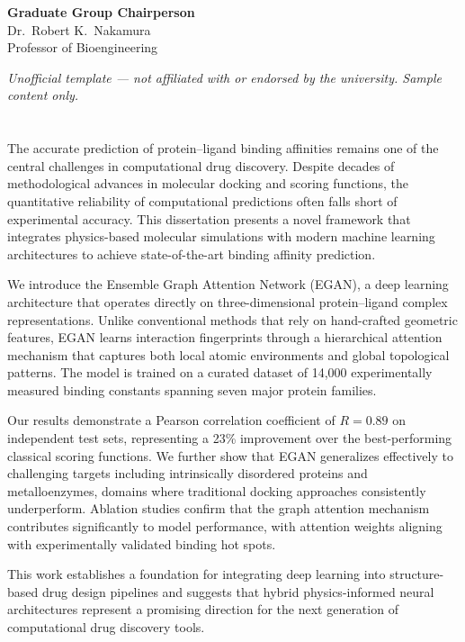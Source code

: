 \documentclass[12pt,oneside]{report}
\renewenvironment{abstract}
  {\chapter*{\abstractname}
   \addcontentsline{toc}{chapter}{\abstractname}
   \singlespacing}
  {}
\begin{document}
\begin{titlepage}
\begin{center}
\vspace{0.8cm}

\begin{minipage}{0.7\textwidth}
\centering
{\large\bfseries Graduate Group Chairperson}\\[8pt]
{\large Dr.\ Robert K.\ Nakamura}\\[4pt]
{\normalsize Professor of Bioengineering}
\end{minipage}

\vfill

{\footnotesize\itshape\color{Charcoal}
Unofficial template --- not affiliated with or endorsed by the university. Sample content only.}

\end{center}
\end{titlepage}


\begin{abstract}

The accurate prediction of protein--ligand binding affinities remains one of the central challenges in computational drug discovery. Despite decades of methodological advances in molecular docking and scoring functions, the quantitative reliability of computational predictions often falls short of experimental accuracy. This dissertation presents a novel framework that integrates physics-based molecular simulations with modern machine learning architectures to achieve state-of-the-art binding affinity prediction.

We introduce the Ensemble Graph Attention Network (EGAN), a deep learning architecture that operates directly on three-dimensional protein--ligand complex representations. Unlike conventional methods that rely on hand-crafted geometric features, EGAN learns interaction fingerprints through a hierarchical attention mechanism that captures both local atomic environments and global topological patterns. The model is trained on a curated dataset of 14,000 experimentally measured binding constants spanning seven major protein families.

Our results demonstrate a Pearson correlation coefficient of $R = 0.89$ on independent test sets, representing a 23\% improvement over the best-performing classical scoring functions. We further show that EGAN generalizes effectively to challenging targets including intrinsically disordered proteins and metalloenzymes, domains where traditional docking approaches consistently underperform. Ablation studies confirm that the graph attention mechanism contributes significantly to model performance, with attention weights aligning with experimentally validated binding hot spots.

This work establishes a foundation for integrating deep learning into structure-based drug design pipelines and suggests that hybrid physics-informed neural architectures represent a promising direction for the next generation of computational drug discovery tools.
\end{abstract}
\end{document}
